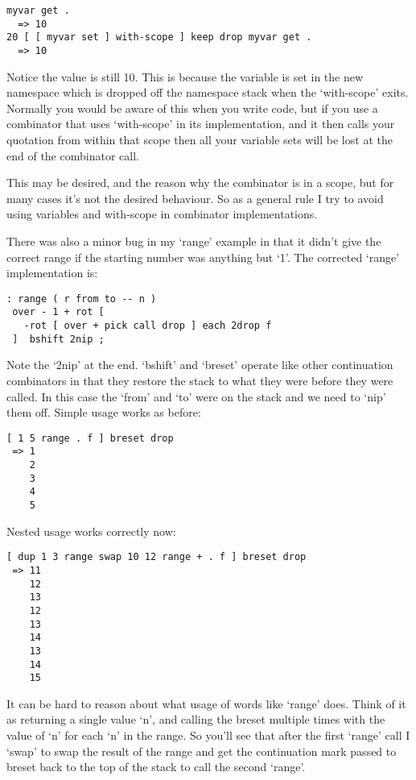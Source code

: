 \begin{verbatim}
myvar get .
  => 10
20 [ [ myvar set ] with-scope ] keep drop myvar get .
  => 10
\end{verbatim}


Notice the value is still 10. This is because the variable is set in
the new namespace which is dropped off the namespace stack when the
`with-scope' exits. Normally you would be aware of this when you write
code, but if you use a combinator that uses `with-scope' in its
implementation, and it then calls your quotation from within that
scope then all your variable sets will be lost at the end of the
combinator call.

This may be desired, and the reason why the combinator is in a scope,
but for many cases it's not the desired behaviour. So as a general
rule I try to avoid using variables and with-scope in combinator
implementations.

There was also a minor bug in my `range' example in that it didn't
give the correct range if the starting number was anything but
`1'. The corrected `range' implementation is:


\begin{verbatim}
: range ( r from to -- n )
 over - 1 + rot [ 
   -rot [ over + pick call drop ] each 2drop f  
 ]  bshift 2nip ;
\end{verbatim}


Note the `2nip' at the end. `bshift' and `breset' operate like other
continuation combinators in that they restore the stack to what they
were before they were called. In this case the `from' and `to' were on
the stack and we need to `nip' them off. Simple usage works as before:


\begin{verbatim}
[ 1 5 range . f ] breset drop
 => 1
    2
    3
    4
    5
\end{verbatim}


Nested usage works correctly now:


\begin{verbatim}
[ dup 1 3 range swap 10 12 range + . f ] breset drop
 => 11
    12
    13
    12
    13
    14
    13
    14
    15
\end{verbatim}


It can be hard to reason about what usage of words like `range'
does. Think of it as returning a single value `n', and calling the
breset multiple times with the value of `n' for each `n' in the
range. So you'll see that after the first `range' call I `swap' to
swap the result of the range and get the continuation mark passed to
breset back to the top of the stack to call the second `range'.

